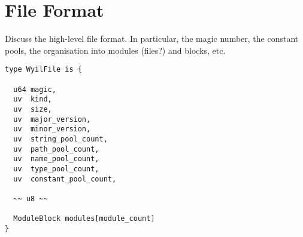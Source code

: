\chapter{File Format}
Discuss the high-level file format.  In particular, the magic number, the constant pools, the organisation into modules (files?) and blocks, etc.

\begin{lstlisting}
type WyilFile is {

  u64 magic,
  uv  kind,
  uv  size,
  uv  major_version,
  uv  minor_version,
  uv  string_pool_count,
  uv  path_pool_count,
  uv  name_pool_count,
  uv  type_pool_count,
  uv  constant_pool_count,

  ~~ u8 ~~

  ModuleBlock modules[module_count]
}
\end{lstlisting}